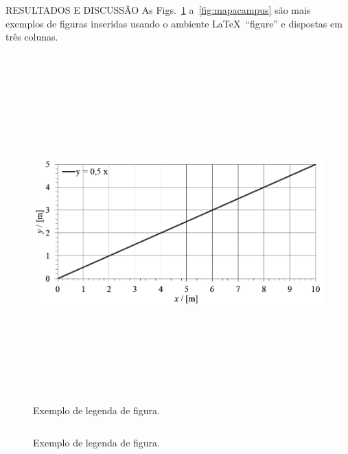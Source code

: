 \documentclass[%
  final,%
  english,%
  brazilian,%
]{beamer}
\begin{document}
\begin{frame}[t, fragile = singleslide]
\begin{columns}[t, onlytextwidth]
%
\begin{column}{\textwidth}
%
\begin{block}{RESULTADOS E DISCUSSÃO}
As Figs.~\ref{fig:graficoxy1} a~\ref{fig:mapacampus} são mais exemplos de figuras inseridas usando o ambiente \LaTeX\ \enquote{figure} e dispostas em três colunas.
\begin{column}[T]{0.33\textwidth}
\begin{figure}[!htb]
\centering%
\caption{Exemplo de legenda de figura.}%
\label{fig:graficoxy1}
\includegraphics[height = 130mm]{./Figuras/graficoxy}
\end{figure}
\end{column}
\yellowvrule%
\begin{column}[T]{0.33\textwidth}
\begin{figure}[!htb]
\centering%
\caption{Exemplo de legenda de figura.}%
\label{fig:graficoxy2}

\end{figure}
\end{column}
\end{block}
\end{column}
\end{columns}
\end{frame}
\end{document}
